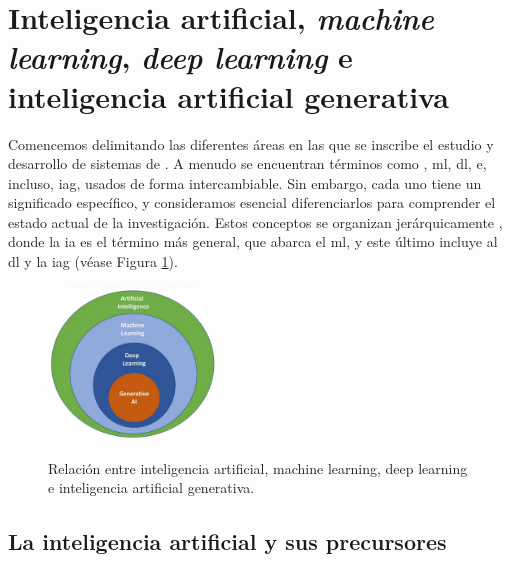 
\section{Inteligencia artificial, \emph{machine learning}, \emph{deep learning} e inteligencia artificial generativa}

Comencemos delimitando las diferentes áreas en las que se inscribe el estudio y desarrollo de sistemas de . A menudo se encuentran términos como , \gls{ml}, \gls{dl}, e, incluso, \gls{iag}, usados de forma intercambiable. Sin embargo, cada uno tiene un significado específico, y consideramos esencial diferenciarlos para comprender el estado actual de la investigación. Estos conceptos se organizan jerárquicamente \citep{torresivinalsPythonDeepLearning2020}, donde la \gls{ia} es el término más general, que abarca el \gls{ml}, y este último incluye al \gls{dl} y la \gls{iag} (véase Figura \ref{fig:ai_ml_dl_gai}).

\begin{figure}[H]
    \caption[Relación entre inteligencia artificial, {machine learning}, {deep learning} e inteligencia artificial generativa]{Relación entre inteligencia artificial, {machine learning}, {deep learning} e inteligencia artificial generativa.}
    \centering
    \includegraphics[width=0.4\textwidth]{./figuras/ai_ml_dl_gai.png}
    \label{fig:ai_ml_dl_gai}
\end{figure}



\subsection{La inteligencia artificial y sus precursores}

